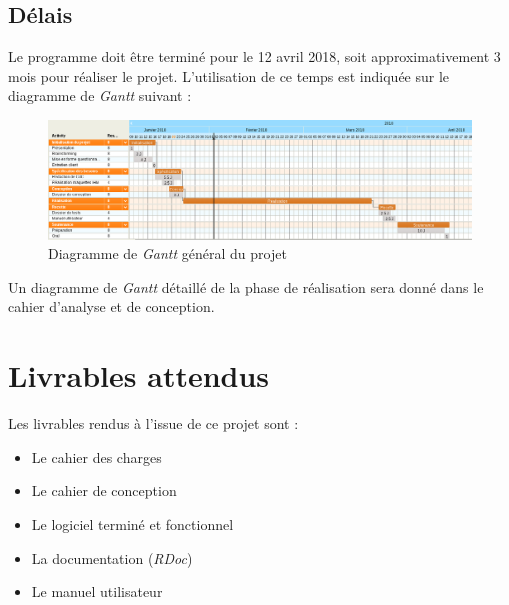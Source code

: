 \documentclass{report}
\begin{document}
	\section{Délais}
		Le programme doit être terminé pour le 12 avril 2018, soit approximativement 3 mois pour réaliser le projet. L'utilisation de ce temps est indiquée sur le diagramme de \textit{Gantt} suivant :

	\begin{figure}[H]
		\centering
		\caption{Diagramme de \textit{Gantt} général du projet}
		\includegraphics[width=17cm]{ganttGeneral.png}
	\end{figure}	     
		
		Un diagramme de \textit{Gantt} détaillé de la phase de réalisation sera donné dans le cahier d'analyse et de conception.
		
\chapter{Livrables attendus}
	Les livrables rendus à l'issue de ce projet sont :
	\begin{itemize}
	\item Le cahier des charges
	\item Le cahier de conception
	\item Le logiciel terminé et fonctionnel
	\item La documentation (\textit{RDoc})
	\item Le manuel utilisateur
	\end{itemize}
		
		
		
\end{document}
